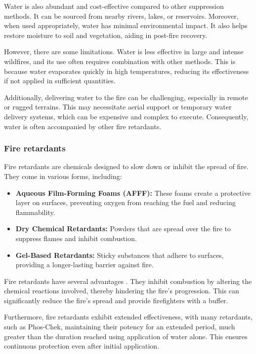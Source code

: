 \documentclass[
  12 pt,
]{Nemilov}
\providecommand{\tightlist}{%
  \setlength{\itemsep}{0pt}\setlength{\parskip}{0pt}}
\begin{document}
Water is also abundant and cost-effective compared to other suppression methods. It can be sourced from nearby rivers, lakes, or reservoirs. Moreover, when used appropriately, water has minimal environmental impact. It also helps restore moisture to soil and vegetation, aiding in post-fire recovery.

However, there are some limitations. Water is less effective in large and intense wildfires, and its use often requires combination with other methods. This is because water evaporates quickly in high temperatures, reducing its effectiveness if not applied in sufficient quantities.

Additionally, delivering water to the fire can be challenging, especially in remote or rugged terrains. This may necessitate aerial support or temporary water delivery systems, which can be expensive and complex to execute. Consequently, water is often accompanied by other fire retardants.

\subsubsection{Fire retardants}\label{fire-retardants}

Fire retardants are chemicals designed to slow down or inhibit the spread of fire. They come in various forms, including:

\begin{itemize}
\tightlist
\item
  \textbf{Aqueous Film-Forming Foams (AFFF):} These foams create a protective layer on surfaces, preventing oxygen from reaching the fuel and reducing flammability.
\item
  \textbf{Dry Chemical Retardants:} Powders that are spread over the fire to suppress flames and inhibit combustion.
\item
  \textbf{Gel-Based Retardants:} Sticky substances that adhere to surfaces, providing a longer-lasting barrier against fire.
\end{itemize}

Fire retardants have several advantages \citep{lu2023dropping, yu2019wildfire}. They inhibit combustion by altering the chemical reactions involved, thereby hindering the fire's progression. This can significantly reduce the fire's spread and provide firefighters with a buffer.

Furthermore, fire retardants exhibit extended effectiveness, with many retardants, such as Phos-Chek, maintaining their potency for an extended period, much greater than the duration reached using application of water alone. This ensures continuous protection even after initial application.
\end{document}
